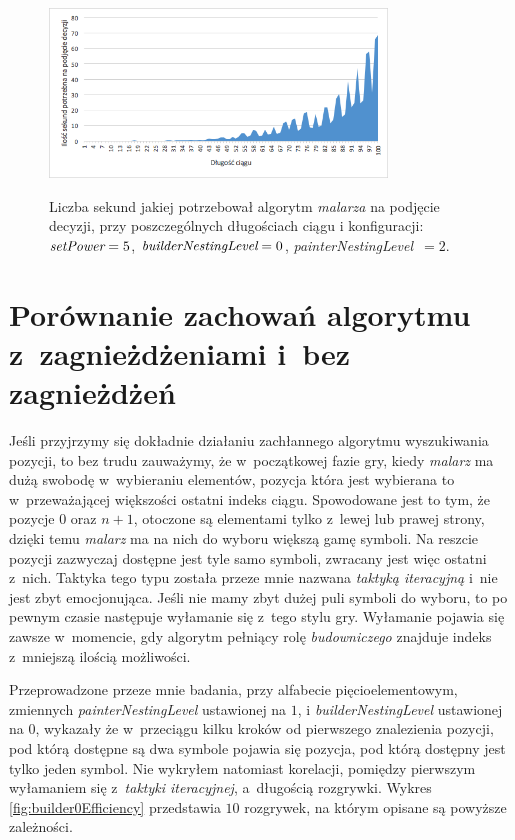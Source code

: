 \documentclass[document]{xmgr}
\begin{document}
\begin{figure}[tbh]
    \centering
    \caption{Liczba sekund jakiej potrzebował algorytm \emph{malarza} na podjęcie decyzji, przy poszczególnych długościach ciągu i konfiguracji: $\emph{setPower}=5$, $\emph{builderNestingLevel}=0$, \emph{painterNestingLevel}~$=2$.}
    \includegraphics[width = 0.8\textwidth]{images2/timePainter2Builder0}
    \label{fig:painter2builder0}
\end{figure}




\section{Porównanie zachowań algorytmu z~zagnieżdżeniami i~bez zagnieżdżeń}
Jeśli przyjrzymy się dokładnie działaniu zachłannego algorytmu wyszukiwania pozycji, to bez trudu zauważymy, że w~początkowej fazie gry, kiedy \emph{malarz} ma dużą swobodę w~wybieraniu elementów, pozycja która jest wybierana to w~przeważającej większości ostatni indeks ciągu. Spowodowane jest to tym, że pozycje $0$ oraz $n+1$, otoczone są elementami tylko z~lewej lub prawej strony, dzięki temu \emph{malarz} ma na nich do wyboru większą gamę symboli. Na reszcie pozycji zazwyczaj dostępne jest tyle samo symboli, zwracany jest więc ostatni z~nich. Taktyka tego typu została przeze mnie nazwana \emph{taktyką iteracyjną} i~nie jest zbyt emocjonująca. Jeśli nie mamy zbyt dużej puli symboli do wyboru, to po pewnym czasie następuje wyłamanie się z~tego stylu gry. Wyłamanie pojawia się zawsze w~momencie, gdy algorytm pełniący rolę \emph{budowniczego} znajduje indeks z~mniejszą ilością możliwości. 

Przeprowadzone przeze mnie badania, przy alfabecie pięcioelementowym, zmiennych \emph{painterNestingLevel} ustawionej na $1$, i \emph{builderNestingLevel} ustawionej na $0$, wykazały że w~przeciągu kilku kroków od pierwszego znalezienia pozycji, pod którą dostępne są dwa symbole pojawia się pozycja, pod którą dostępny jest tylko jeden symbol. Nie wykryłem natomiast korelacji, pomiędzy pierwszym wyłamaniem się z~\emph{taktyki iteracyjnej}, a~długością rozgrywki. Wykres \ref{fig:builder0Efficiency} przedstawia $10$ rozgrywek, na którym opisane są powyższe zależności.
 
\end{document}
